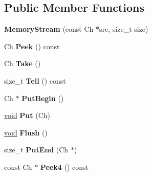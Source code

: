 \subsection*{Public Member Functions}
\begin{DoxyCompactItemize}
\item 
\hypertarget{struct_memory_stream_a2472317ef00fcd44e5cc209e04c49756}{}{\bfseries Memory\+Stream} (const Ch $\ast$src, size\+\_\+t size)\label{struct_memory_stream_a2472317ef00fcd44e5cc209e04c49756}

\item 
\hypertarget{struct_memory_stream_aa6ea0b20b8687b2ee6779b879bfa846d}{}Ch {\bfseries Peek} () const \label{struct_memory_stream_aa6ea0b20b8687b2ee6779b879bfa846d}

\item 
\hypertarget{struct_memory_stream_a14ff92deda5d39c9b166aaa07e82a0ee}{}Ch {\bfseries Take} ()\label{struct_memory_stream_a14ff92deda5d39c9b166aaa07e82a0ee}

\item 
\hypertarget{struct_memory_stream_a0b92aeeb6cc21f8f4c79b679d7034a1c}{}size\+\_\+t {\bfseries Tell} () const \label{struct_memory_stream_a0b92aeeb6cc21f8f4c79b679d7034a1c}

\item 
\hypertarget{struct_memory_stream_a5674d10aa2faa05cb326e2e16715cc3d}{}Ch $\ast$ {\bfseries Put\+Begin} ()\label{struct_memory_stream_a5674d10aa2faa05cb326e2e16715cc3d}

\item 
\hypertarget{struct_memory_stream_ac445f93c23c9e85f1f5381911c4ed870}{}\hyperlink{_s_d_l__audio_8h_a52835ae37c4bb905b903cbaf5d04b05f}{void} {\bfseries Put} (Ch)\label{struct_memory_stream_ac445f93c23c9e85f1f5381911c4ed870}

\item 
\hypertarget{struct_memory_stream_a305e141314ae0e3afacb04aaf2d8bcc6}{}\hyperlink{_s_d_l__audio_8h_a52835ae37c4bb905b903cbaf5d04b05f}{void} {\bfseries Flush} ()\label{struct_memory_stream_a305e141314ae0e3afacb04aaf2d8bcc6}

\item 
\hypertarget{struct_memory_stream_a74fb36c1f6f95d189502cf7a6be79135}{}size\+\_\+t {\bfseries Put\+End} (Ch $\ast$)\label{struct_memory_stream_a74fb36c1f6f95d189502cf7a6be79135}

\item 
\hypertarget{struct_memory_stream_a49ab99772a16ead12bd56357b4801d94}{}const Ch $\ast$ {\bfseries Peek4} () const \label{struct_memory_stream_a49ab99772a16ead12bd56357b4801d94}

\end{DoxyCompactItemize}
